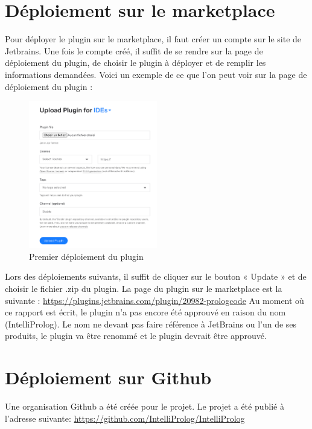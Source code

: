 \section{Déploiement sur le marketplace}
\noindent Pour déployer le plugin sur le marketplace, il faut créer un compte sur le site de Jetbrains.
Une fois le compte créé, il suffit de se rendre sur la page de déploiement du plugin, de choisir le plugin à déployer et de remplir les informations demandées.
\newdoubleline Voici un exemple de ce que l'on peut voir sur la page de déploiement du plugin :

\begin{figure}[H]
    \centering
    \includegraphics[width=0.5\textwidth]{images/first_deploy.png}
    \caption{Premier déploiement du plugin}
    \label{fig:first_deploy}
\end{figure}

\noindent Lors des déploiements suivants, il suffit de cliquer sur le bouton « Update » et de choisir le fichier .zip du plugin.
\newdoubleline La page du plugin sur le marketplace est la suivante : \url{https://plugins.jetbrains.com/plugin/20982-prologcode}
\newdoubleline Au moment où ce rapport est écrit, le plugin n'a pas encore été approuvé en raison du nom (IntelliProlog). Le nom ne devant pas faire référence à JetBrains ou l'un de ses produits, le plugin va être renommé et le plugin devrait être approuvé.

\section{Déploiement sur Github}
\noindent Une organisation Github a été créée pour le projet.
Le projet a été publié à l'adresse suivante: \url{https://github.com/IntelliProlog/IntelliProlog}


